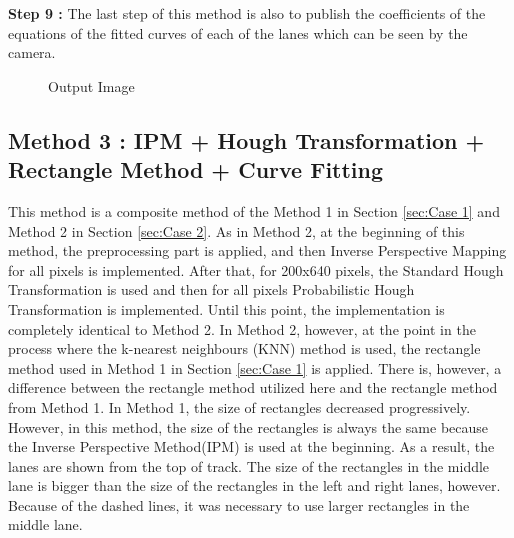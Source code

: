 \textbf{Step 9 : }The last step of this method is also to publish the coefficients of the equations of the fitted curves of each of the lanes which can be seen by the camera.


\begin{figure}[H]
  \centering
  \caption{Output Image}
\end{figure} 


\subsection{Method 3 : IPM + Hough Transformation + Rectangle Method + Curve Fitting}\label{sec:Case 3}

This method is a composite method of the Method 1 in Section \ref{sec:Case 1} and Method 2 in Section \ref{sec:Case 2}. As in Method 2, at the beginning of this method, the preprocessing part is applied, and then Inverse Perspective Mapping for all pixels is implemented. After that, for 200x640 pixels, the Standard Hough Transformation is used and then for all pixels Probabilistic Hough Transformation is implemented. Until this point, the implementation is completely identical to Method 2. In Method 2, however, at the point in the process where the k-nearest neighbours (KNN) method is used, the rectangle method used in Method 1 in Section \ref{sec:Case 1} is applied. There is, however, a difference between the rectangle method utilized here and the rectangle method from Method 1. In Method 1, the size of rectangles decreased progressively. However, in this method, the size of the rectangles is always the same because the Inverse Perspective Method(IPM) is used at the beginning. As a result, the lanes are shown from the top of track. The size of the rectangles in the middle lane is bigger than the size of the rectangles in the left and right lanes, however. Because of the dashed lines, it was necessary to use larger rectangles in the middle lane.

